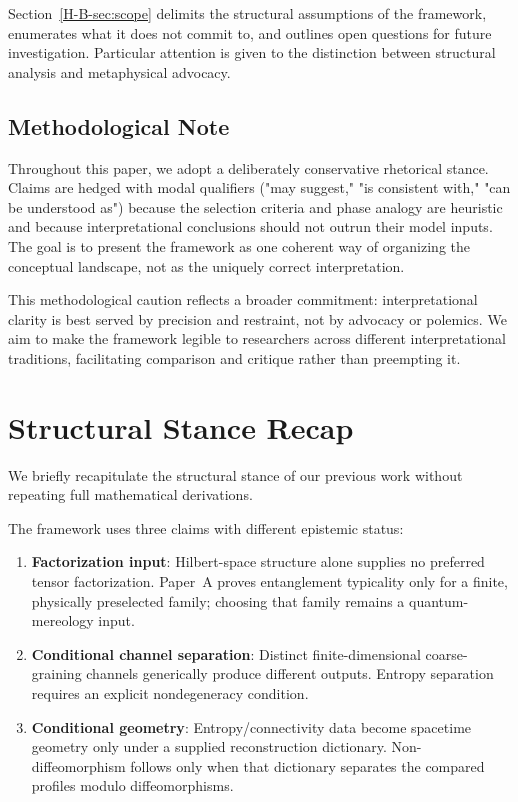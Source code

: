 \documentclass[12pt,a4paper,openany]{book}
\begin{document}
Section~\ref{H-B-sec:scope} delimits the structural assumptions of the framework, enumerates what it does not commit to, and outlines open questions for future investigation. Particular attention is given to the distinction between structural analysis and metaphysical advocacy.

\subsection{Methodological Note}

Throughout this paper, we adopt a deliberately conservative rhetorical stance. Claims are hedged with modal qualifiers ("may suggest," "is consistent with," "can be understood as") because the selection criteria and phase analogy are heuristic and because interpretational conclusions should not outrun their model inputs. The goal is to present the framework as one coherent way of organizing the conceptual landscape, not as the uniquely correct interpretation.

This methodological caution reflects a broader commitment: interpretational clarity is best served by precision and restraint, not by advocacy or polemics. We aim to make the framework legible to researchers across different interpretational traditions, facilitating comparison and critique rather than preempting it.

\section{Structural Stance Recap}
\label{H-B-sec:stance}

We briefly recapitulate the structural stance of our previous work without repeating full mathematical derivations.

The framework uses three claims with different epistemic status:
\begin{enumerate}
\item \textbf{Factorization input}: Hilbert-space structure alone supplies no preferred tensor factorization.  Paper~A proves entanglement typicality only for a finite, physically preselected family; choosing that family remains a quantum-mereology input.

\item \textbf{Conditional channel separation}: Distinct finite-dimensional coarse-graining channels generically produce different outputs.  Entropy separation requires an explicit nondegeneracy condition.

\item \textbf{Conditional geometry}: Entropy/connectivity data become spacetime geometry only under a supplied reconstruction dictionary.  Non-diffeomorphism follows only when that dictionary separates the compared profiles modulo diffeomorphisms.
\end{enumerate}
\end{document}
